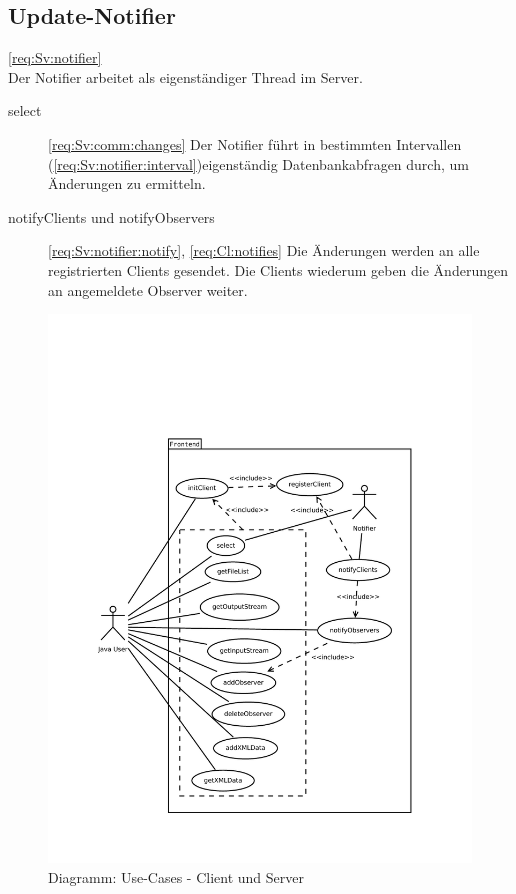 \subsection{Update-Notifier} \ref{req:Sv:notifier} \\
Der Notifier arbeitet als eigenständiger Thread im Server.
\begin{description}
	\item [select] 
		\ref{req:Sv:comm:changes}
		Der Notifier führt in bestimmten Intervallen (\ref{req:Sv:notifier:interval})eigenständig Datenbankabfragen durch,
		um Änderungen zu ermitteln.
	\item [notifyClients und notifyObservers] \ref{req:Sv:notifier:notify},
		\ref{req:Cl:notifies}
		Die Änderungen werden an alle registrierten Clients gesendet.
		Die Clients wiederum geben die Änderungen an angemeldete Observer weiter.
\end{description}
\begin{figure}[H]
	\centering
	\label{dia:design:frontend:usecase}
	\includegraphics[height=0.9\textheight]{design/frontend/usecase.pdf}
	\caption{Diagramm: Use-Cases - Client und Server}
\end{figure}

